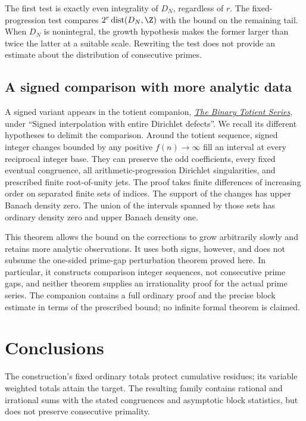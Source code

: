 The first test is exactly even integrality of $D_N$, regardless of $r$.
The fixed-progression test compares $2^r\operatorname{dist}(D_N,\Z)$
with the bound on the remaining tail.  When $D_N$ is nonintegral, the
growth hypothesis makes the former larger than twice the latter at a
suitable scale.  Rewriting the
test does not provide an estimate about the distribution of consecutive primes.

\subsection{A signed comparison with more analytic data}
\label{long251:sec:signed-dirichlet-comparison}
A signed variant appears in the totient companion,
\href{https://github.com/wcook04/plectis-erdos/blob/58c4042b103a8263e3a8214a9af20999ff4897a9/paper/249/erdos249-totient-reasoning-surface.pdf}{\emph{The Binary Totient Series}},
under ``Signed interpolation with entire Dirichlet defects''.
We recall its different hypotheses to delimit the comparison. Around the totient sequence,
signed integer changes bounded by any positive $f(n)\to\infty$ fill an
interval at every reciprocal integer base. They can preserve the odd
coefficients, every fixed eventual congruence, all arithmetic-progression
Dirichlet singularities, and prescribed finite root-of-unity jets. The
proof takes finite differences of increasing order on separated finite
sets of indices.  The support of the changes has upper Banach density
zero.  The union of the intervals spanned by those sets has ordinary
density zero and upper Banach density one.

This theorem allows the bound on the corrections to grow arbitrarily slowly and retains more
analytic observations. It uses both signs, however, and does not subsume
the one-sided prime-gap perturbation theorem proved here. In particular,
it constructs comparison integer sequences, not consecutive prime gaps,
and neither theorem supplies an irrationality proof for the actual prime
series. The companion contains a full ordinary proof and the precise
block estimate in terms of the prescribed bound; no infinite formal theorem is claimed.

\section{Conclusions}\label{sec:erdos-251-complete-family-map}
The construction's fixed ordinary totals protect cumulative residues;
its variable weighted totals attain the target.  The resulting family
contains rational and irrational sums with the stated congruences and
asymptotic block statistics, but does not preserve consecutive primality.

